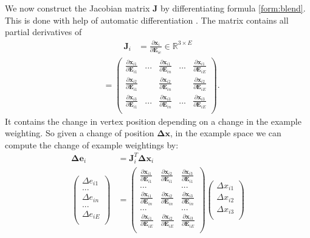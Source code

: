 \documentclass[
	11pt, 
	DIV10,
	a4paper, 
	oneside, 
	headings=normal, 
	captions=tableheading,
	final, 
	numbers=noenddot
]{scrartcl}
\begin{document}
We now construct the Jacobian matrix $\bm J$ by differentiating formula \ref{form:blend}. This is done with help of automatic differentiation \cite{autoDiff}. The matrix contains all partial derivatives of 
\begin{align}
\bm J_i &= \frac{\partial\bm x_i}{\partial \bm E_{ie}} \in \mathbb{R}^{3\times E}
\end{align}
\begin{align}
&=
\begin{pmatrix}
\frac{\partial\bm x_{i1}}{\partial \bm E_{i1}} &...&\frac{\partial\bm x_{i1}}{\partial \bm E_{in}} &...&\frac{\partial\bm x_{i1}}{\partial \bm E_{iE}} \\
\frac{\partial\bm x_{i2}}{\partial \bm E_{i1}}&&\frac{\partial\bm x_{i2}}{\partial \bm E_{in}}&&\frac{\partial\bm x_{i2}}{\partial \bm E_{iE}}\\
\frac{\partial\bm x_{i3}}{\partial \bm E_{i1}} &...&\frac{\partial\bm x_{i3}}{\partial \bm E_{in}} &...&\frac{\partial\bm x_{i3}}{\partial \bm E_{iE}} \\
\end{pmatrix}
.
\end{align}
It contains the change in vertex position depending on a change in the example weighting. So given a change of position $\bm{\Delta x}$, in the example space we can compute the change of example weightings by:
\begin{align}
\bm{\Delta e}_i &= \bm J_i^T \bm{\Delta x}_i\\
\begin{pmatrix}
\Delta e_{i1} \\
...\\
\Delta e_{in} \\
...\\
\Delta e_{iE} \\
\end{pmatrix}
&=
\begin{pmatrix}
\frac{\partial\bm x_{i1}}{\partial \bm E_{i1}} &\frac{\partial\bm x_{i2}}{\partial \bm E_{i1}}&\frac{\partial\bm x_{i3}}{\partial \bm E_{i1}}\\
...&&...\\
\frac{\partial\bm x_{i1}}{\partial \bm E_{in}}&\frac{\partial\bm x_{i2}}{\partial \bm E_{in}}&\frac{\partial\bm x_{i3}}{\partial \bm E_{in}}\\
...&&...\\
\frac{\partial\bm x_{i1}}{\partial \bm E_{iE}}&\frac{\partial\bm x_{i2}}{\partial \bm E_{iE}}&\frac{\partial\bm x_{i3}}{\partial \bm E_{iE}}\\
\end{pmatrix}
\begin{pmatrix}
\Delta x_{i1}\\
\Delta x_{i2}\\
\Delta x_{i3}\\
\end{pmatrix}
\end{align}
\end{document}
